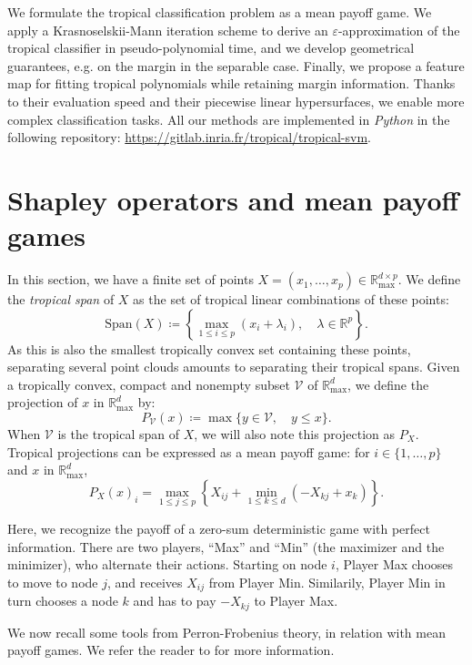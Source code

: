 \documentclass[oneside,UKenglish,a4paper]{amsart}
\numberwithin{equation}{section}
\numberwithin{figure}{section}
\theoremstyle{plain}
\theoremstyle{definition}
\theoremstyle{plain}
\theoremstyle{remark}
\theoremstyle{plain}
\theoremstyle{definition}
\theoremstyle{definition}
\begin{document}
We formulate the tropical classification problem as a mean payoff game. We apply a Krasnoselskii-Mann iteration scheme to derive an $\varepsilon$-approximation of the tropical classifier in pseudo-polynomial time, and we develop geometrical guarantees, e.g. on the margin in the separable case. Finally, we propose a feature map for fitting tropical polynomials while retaining margin information. Thanks to their evaluation speed and their piecewise linear hypersurfaces, we enable more complex classification tasks. All our methods are implemented in \emph{Python} in the following repository: \url{https://gitlab.inria.fr/tropical/tropical-svm}.

\section{Shapley operators and mean payoff games}

In this section, we have a finite set of points $X=(x_{1},\ldots,x_{p})\in\mathbb{R}_{\text{max}}^{d\times p}$.
We define the \emph{tropical span} of $X$ as the set of tropical
linear combinations of these points:
\[
\text{Span}(X)\coloneqq\left\{\max_{1\le i\le p}(x_{i}+\lambda_{i}),\quad\lambda\in\mathbb{R}^{p}\right\}.
\]
As this is also the smallest tropically convex set containing these
points, separating several point clouds amounts to separating their
tropical spans. Given a tropically convex, compact and nonempty subset $\mathcal{V}$
of $\mathbb{R}_{\max}^{d}$, we define the projection of
$x$ in $\mathbb{R}_{\max}^{d}$ by:
\[
P_{\mathcal{V}}(x)\coloneqq\max\{y\in \mathcal{V},\quad y\le x\}.
\]
When $\mathcal{V}$ is the tropical span of $X$, we will also note
this projection as $P_{X}$. Tropical projections
can be expressed as a mean payoff game: for $i\in\{1,\ldots, p\}$ and $x$ in $\mathbb{R}_{\max}^{d}$,   \cite{Maclagan2015}
\begin{equation*}
P_{X}(x)_{i}=\max_{1\le j\le p}\left\{X_{ij}+\min_{1\le k \le d}(-X_{kj}+x_{k})\right\}.
\end{equation*}

Here, we recognize the payoff of a zero-sum deterministic game with perfect
information. There are two players, ``Max'' and ``Min'' (the maximizer
and the minimizer), who alternate their actions. Starting on node
$i$, Player Max chooses to move to node $j$, and receives $X_{ij}$
from Player Min. Similarily, Player Min in turn chooses a node $k$
and has to pay $-X_{kj}$ to Player Max.

We now recall some tools from Perron-Frobenius theory, in relation
with mean payoff games. We refer the reader to \cite{AKIAN2012} for more
information.
\end{document}
